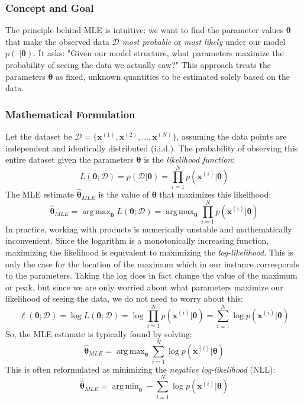 \documentclass{article}
\DeclareMathOperator*{\argmax}{arg\,max}
\DeclareMathOperator*{\argmin}{arg\,min}
\begin{document}
\subsubsection{Concept and Goal}
The principle behind MLE is intuitive: we want to find the parameter values $\bm{\theta}$ that make the observed data $\mathcal{D}$ \emph{most probable} or \emph{most likely} under our model $p(\cdot | \bm{\theta})$. It asks: "Given our model structure, what parameters maximize the probability of seeing the data we actually saw?" This approach treats the parameters $\bm{\theta}$ as fixed, unknown quantities to be estimated solely based on the data.

\subsubsection{Mathematical Formulation}
Let the dataset be $\mathcal{D} = \{ \mathbf{x}^{(1)}, \mathbf{x}^{(2)}, ..., \mathbf{x}^{(N)} \}$, assuming the data points are independent and identically distributed (i.i.d.). The probability of observing this entire dataset given the parameters $\bm{\theta}$ is the \emph{likelihood function}:
\begin{equation}
    L(\bm{\theta}; \mathcal{D}) = p(\mathcal{D} | \bm{\theta}) = \prod_{i=1}^{N} p(\mathbf{x}^{(i)} | \bm{\theta})
\end{equation}
The MLE estimate $\hat{\bm{\theta}}_{MLE}$ is the value of $\bm{\theta}$ that maximizes this likelihood:
\begin{equation}
    \hat{\bm{\theta}}_{MLE} = \argmax_{\bm{\theta}} L(\bm{\theta}; \mathcal{D}) = \argmax_{\bm{\theta}} \prod_{i=1}^{N} p(\mathbf{x}^{(i)} | \bm{\theta})
\end{equation}
In practice, working with products is numerically unstable and mathematically inconvenient. Since the logarithm is a monotonically increasing function, maximizing the likelihood is equivalent to maximizing the \emph{log-likelihood}. This is only the case for the location of the maximum which in our instance corresponds to the parameters. Taking the log does in fact change the value of the maximum or peak, but since we are only worried about what parameters maximize our likelihood of seeing the data, we do not need to worry about this:
\begin{equation}
    \ell(\bm{\theta}; \mathcal{D}) = \log L(\bm{\theta}; \mathcal{D}) = \log \prod_{i=1}^{N} p(\mathbf{x}^{(i)} | \bm{\theta}) = \sum_{i=1}^{N} \log p(\mathbf{x}^{(i)} | \bm{\theta})
\end{equation}
So, the MLE estimate is typically found by solving:
\begin{equation} \label{eq:mle_opt}
    \hat{\bm{\theta}}_{MLE} = \argmax_{\bm{\theta}} \sum_{i=1}^{N} \log p(\mathbf{x}^{(i)} | \bm{\theta})
\end{equation}
This is often reformulated as minimizing the \emph{negative log-likelihood} (NLL):
\begin{equation}
    \hat{\bm{\theta}}_{MLE} = \argmin_{\bm{\theta}} -\sum_{i=1}^{N} \log p(\mathbf{x}^{(i)} | \bm{\theta})
\end{equation}
\end{document}
